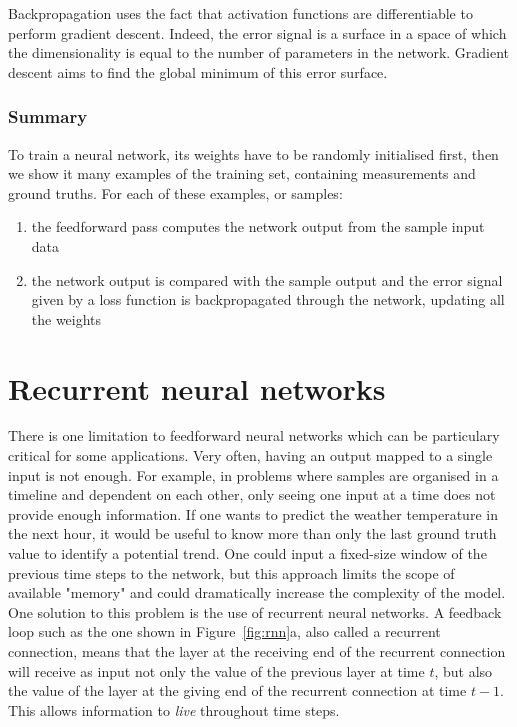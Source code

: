Backpropagation uses the fact that activation functions are differentiable to
perform gradient descent. Indeed, the error signal is a surface in a space
of which the dimensionality is equal to the number of parameters in the
network. Gradient descent aims to find the global minimum of this error
surface.\\


\subsubsection{Summary}
To train a neural network, its weights have to be randomly initialised first,
then we show it many examples of the training set, containing measurements and
ground truths. For each of these examples, or samples:
\begin{enumerate}
	\item the feedforward pass computes the network output from the sample
		input data
	\item the network output is compared with the sample output and the
		error signal given by a loss function
		is backpropagated through the network, updating
		all the weights
\end{enumerate}


\section{Recurrent neural networks}
There is one limitation to feedforward neural networks which can be particulary
critical for some applications. Very often, having an output mapped to a 
single input is not enough. For example, in problems where samples are organised
in a timeline and dependent on each other, only seeing one input at a time
does not provide enough information. If one wants to predict the weather
temperature in the next hour, it would be useful to know more than only the
last ground truth value to identify a potential trend. One 
could input a fixed-size window of the previous time steps to the network,
but this approach limits the scope of available "memory" and could dramatically
increase the complexity of the model.\\

One solution to this problem is the use of recurrent neural networks.
A feedback loop such as the one shown in Figure~\ref{fig:rnn}a, also called
a recurrent connection, means that the layer at the receiving end of the
recurrent connection will receive as input not only the value of the previous
layer at time $t$, but also the value of the layer at the giving end of the 
recurrent connection at time $t-1$. This allows information to \textit{live}
throughout time steps.\\

